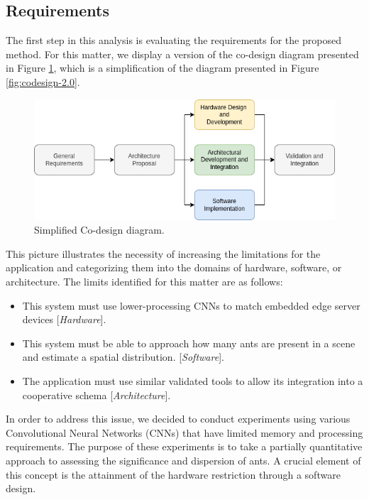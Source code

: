 \subsection{Requirements}

The first step in this analysis is evaluating the requirements for the proposed method. For this matter, we display a version of the co-design diagram presented in Figure \ref{fig:simplified-codesign-3}, which is a simplification of the diagram presented in Figure \ref{fig:codesign-2.0}. 

\begin{figure}[ht!]
    \centering
    \includegraphics[width = .8\linewidth]{Figures/simplified-codesign.png}
    \caption{Simplified Co-design diagram.}
    \label{fig:simplified-codesign-3}
\end{figure}

This picture illustrates the necessity of increasing the limitations for the application and categorizing them into the domains of hardware, software, or architecture. The limits identified for this matter are as follows:

\begin{itemize}
    \item This system must use lower-processing CNNs to match embedded edge server devices [\textit{Hardware}].
    \item This system must be able to approach how many ants are present in a scene and estimate a spatial distribution. [\textit{Software}].
    \item The application must use similar validated tools to allow its integration into a cooperative schema [\textit{Architecture}].
\end{itemize}

In order to address this issue, we decided to conduct experiments using various Convolutional Neural Networks (CNNs) that have limited memory and processing requirements. The purpose of these experiments is to take a partially quantitative approach to assessing the significance and dispersion of ants. A crucial element of this concept is the attainment of the hardware restriction through a software design.

